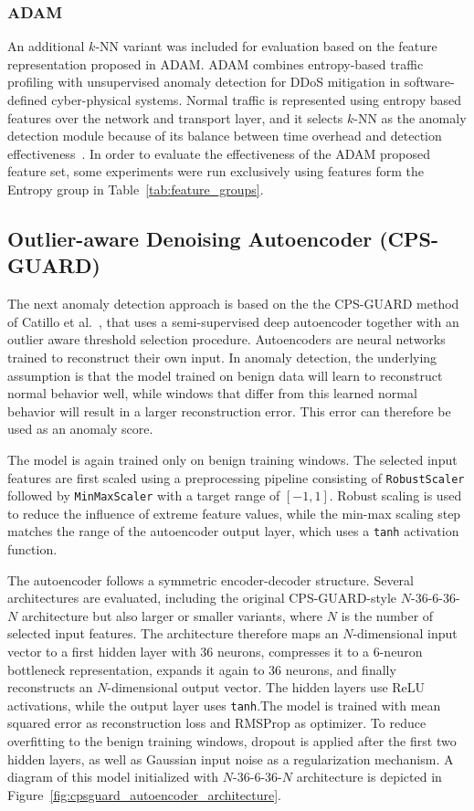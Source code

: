 \subsubsection{ADAM}
\label{sec:ADAM}
An additional $k$-NN variant was included for evaluation based on the feature representation proposed in ADAM. ADAM combines entropy-based traffic profiling with unsupervised anomaly detection for DDoS mitigation in software-defined cyber-physical systems. Normal traffic is represented using entropy based features over the network and transport layer, and it selects $k$-NN as the anomaly detection module because of its balance between time overhead and detection effectiveness~\cite{cai_adam_2023}. In order to evaluate the effectiveness of the ADAM proposed feature set, some experiments were run exclusively using features form the Entropy group in Table~\ref{tab:feature_groups}.



\subsection{Outlier-aware Denoising Autoencoder (CPS-GUARD)}
The next anomaly detection approach is based on the the CPS-GUARD method of Catillo et al.~\cite{catillo_cps-guard_2023}, that uses a semi-supervised deep autoencoder together with an outlier aware threshold selection procedure. Autoencoders are neural networks trained to reconstruct their own input. In anomaly detection, the underlying assumption is that the model trained on benign data will learn to reconstruct normal behavior well, while windows that differ from this learned normal behavior will result in a larger reconstruction error. This error can therefore be used as an anomaly score.

The model is again trained only on benign training windows. The selected input features are first scaled using a preprocessing pipeline consisting of \texttt{RobustScaler} followed by \texttt{MinMaxScaler} with a target range of \([-1,1]\). Robust scaling is used to reduce the influence of extreme feature values, while the min-max scaling step matches the range of the autoencoder output layer, which uses a \texttt{tanh} activation function.

The autoencoder follows a symmetric encoder-decoder structure. Several architectures are evaluated, including the original CPS-GUARD-style \(N\)-36-6-36-\(N\) architecture but also larger or smaller variants, where \(N\) is the number of selected input features. The architecture therefore maps an \(N\)-dimensional input vector to a first hidden layer with 36 neurons, compresses it to a 6-neuron bottleneck representation, expands it again to 36 neurons, and finally reconstructs an \(N\)-dimensional output vector. The hidden layers use ReLU activations, while the output layer uses \texttt{tanh}.The model is trained with mean squared error as reconstruction loss and RMSProp as optimizer. To reduce overfitting to the benign training windows, dropout is applied after the first two hidden layers, as well as Gaussian input noise as a regularization mechanism. A diagram of this model initialized with \(N\)-36-6-36-\(N\) architecture is depicted in Figure~\ref{fig:cpsguard_autoencoder_architecture}.

